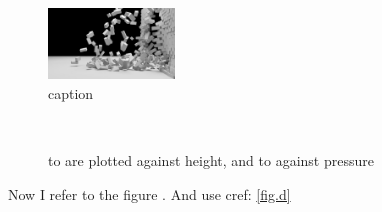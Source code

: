 \documentclass{article}
\begin{document}
\title{}
\author{}
\maketitle
\newpage
\tableofcontents
\newpage

\begin{figure}
\centering
\includegraphics[width=0.3\textwidth]{ex}
\caption{caption}
\label{fig.label}
\end{figure}

\begin{figure}
\centering
{}\qquad
{}\\
\qquad
{}
\caption{\protect{} to \protect{} are plotted against height, and \protect{} to \protect{} against pressure}
\end{figure}
Now I refer to the figure . And use cref: \cref{fig.d}
\end{document}
